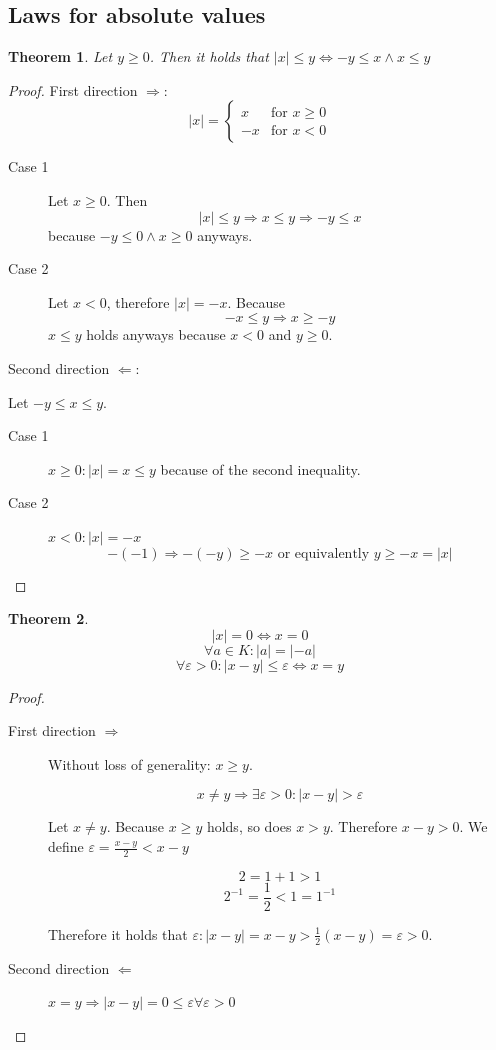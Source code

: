 \documentclass[a4paper,landscape,twocolumn]{article}
\newtheorem{theorem}{Theorem}
\newcommand\abs[1]{\left|#1\right|}
\begin{document}
\subsection{Laws for absolute values}
%
\begin{theorem}
  Let $y \geq 0$. Then it holds that $\abs{x} \leq y \Leftrightarrow -y \leq x \land x \leq y$
\end{theorem}
\begin{proof}
  First direction $\Rightarrow$:
  \[
    \abs{x} = \begin{cases}
      x & \text{for } x \geq 0\\
      -x & \text{for } x < 0
    \end{cases}
  \]
  \begin{description}
    \item[Case 1] Let $x \geq 0$. Then
      \[ \abs{x} \leq y \Rightarrow x \leq y \Rightarrow -y \leq x \]
      because $-y \leq 0 \land x \geq 0$ anyways.
    \item[Case 2] Let $x < 0$, therefore $\abs{x} = -x$. Because
      \[ -x \leq y \Rightarrow x \geq -y \]
      $x \leq y$ holds anyways because $x < 0$ and $y \geq 0$.
  \end{description}

  Second direction $\Leftarrow$:

  Let $-y \leq x \leq y$.
  \begin{description}
    \item[Case 1] $x \geq 0: \abs{x} = x \leq y$ because of the second inequality.
    \item[Case 2] $x < 0: \abs{x} = -x$
      \[ -(-1) \Rightarrow -(-y) \geq -x \text{ or equivalently } y \geq -x = \abs{x} \]
  \end{description}
\end{proof}

\begin{theorem}
  \[ \abs{x} = 0 \Leftrightarrow x = 0 \]
  \[ \forall a \in K: \abs{a} = \abs{-a} \]
  \[ \forall \varepsilon > 0: \abs{x - y} \leq \varepsilon \Leftrightarrow x = y \]
\end{theorem}

\begin{proof}
  \begin{description}
    \item[First direction $\Rightarrow$]
      Without loss of generality: $x \geq y$.

      \[ x \neq y \Rightarrow \exists \varepsilon > 0: \abs{x - y} > \varepsilon \]

      Let $x \neq y$. Because $x \geq y$ holds, so does $x > y$. Therefore $x - y > 0$.
      We define $\varepsilon = \frac{x-y}{2} < x - y$

      \[ 2 = 1 + 1 > 1 \]
      \[ 2^{-1} = \frac12 < 1 = 1^{-1} \]

      Therefore it holds that $\varepsilon: \abs{x-y} = x - y > \frac12(x - y) = \varepsilon > 0$.

    \item[Second direction $\Leftarrow$]
      $x = y \Rightarrow \abs{x-y} = 0 \leq \varepsilon \forall \varepsilon > 0$
  \end{description}
\end{proof}
\end{document}

